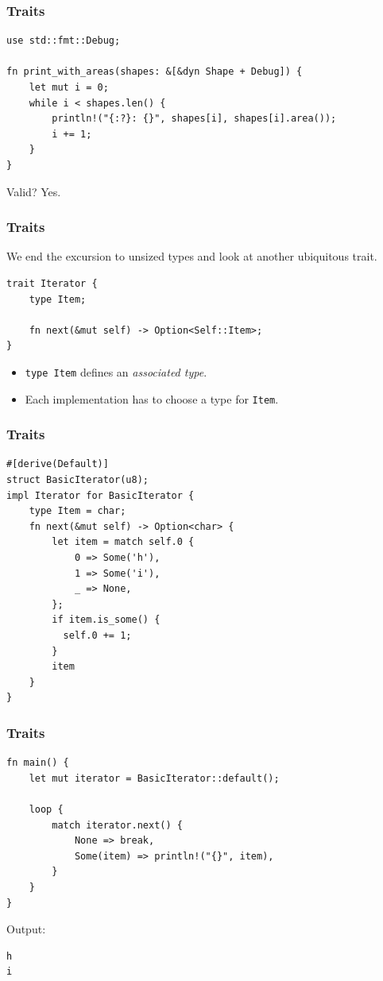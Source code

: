 \begin{frame}[fragile]
    \frametitle{Traits}
    \begin{verbatim}
use std::fmt::Debug;

fn print_with_areas(shapes: &[&dyn Shape + Debug]) {
    let mut i = 0;
    while i < shapes.len() {
        println!("{:?}: {}", shapes[i], shapes[i].area());
        i += 1;
    }
}
    \end{verbatim}
    \vfill
    Valid?
    \pause
    Yes.
\end{frame}

\begin{frame}[fragile]
    \frametitle{Traits}
    We end the excursion to unsized types and look at another ubiquitous trait.
    \vfill
    \begin{verbatim}
trait Iterator {
    type Item;

    fn next(&mut self) -> Option<Self::Item>;
}
    \end{verbatim}
    \pause
    \vfill
    \begin{itemize}
        \item \texttt{type Item} defines an \textit{associated type}.
        \item Each implementation has to choose a type for \texttt{Item}.
    \end{itemize}
\end{frame}

\begin{frame}[fragile]
    \frametitle{Traits}
    \begin{verbatim}
#[derive(Default)]
struct BasicIterator(u8);
impl Iterator for BasicIterator {
    type Item = char;
    fn next(&mut self) -> Option<char> {
        let item = match self.0 {
            0 => Some('h'),
            1 => Some('i'),
            _ => None,
        };
        if item.is_some() {
          self.0 += 1;
        }
        item
    }
}
    \end{verbatim}
\end{frame}

\begin{frame}[fragile]
    \frametitle{Traits}
    \begin{verbatim}
fn main() {
    let mut iterator = BasicIterator::default();

    loop {
        match iterator.next() {
            None => break,
            Some(item) => println!("{}", item),
        }
    }
}
    \end{verbatim}
    \vfill
    Output:
    \pause
    \begin{verbatim}
h
i
    \end{verbatim}
\end{frame}

